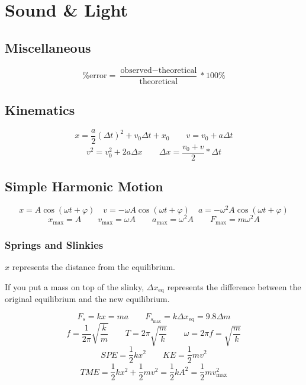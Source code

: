 \chapter{Sound \& Light}

\newcommand\meter[0]{\text{m}}
\newcommand\watt[0]{\text{W}}
\newcommand\Joule[0]{\text{J}}
\newcommand\second[0]{\text{s}}
\newcommand\decibel[0]{\text{dB}}

\section{Miscellaneous}

\[
	\text{\% error} = \frac{\text{observed} - \text{theoretical}}{\text{theoretical}} * 100\%
\]

\section{Kinematics}

\[
	x = \frac{a}{2}(\Delta t)^2 + v_0\Delta t + x_0 \qquad
	v = v_0 + a\Delta t
\]\[
	v^2 = v_0^2 + 2a\Delta x \qquad
	\Delta x = \frac{v_0 + v}{2} * \Delta t
\]

\section{Simple Harmonic Motion}

\[
	x = A \cos(\omega t + \varphi) \quad
	v = -\omega A \cos(\omega t + \varphi) \quad
	a = -\omega^2 A \cos(\omega t + \varphi)
\]
\[
	x_{\max} = A \qquad
	v_{\max} = \omega A \qquad
	a_{\max} = \omega^2 A \qquad
	F_{\max} = m\omega^2 A
\]

\subsection{Springs and Slinkies}

$x$ represents the distance from the equilibrium.

If you put a mass on top of the slinky, $\Delta x_\text{eq}$ represents the difference between the original equilibrium and the new equilibrium.

\[
	F_s = kx = ma \qquad
	F_{s_{\max}} = k\Delta x_\text{eq} = 9.8 \Delta m
\]
\[
	f = \frac{1}{2\pi}\sqrt{\frac{k}{m}} \qquad 
	T = 2\pi\sqrt{\frac{m}{k}} \qquad 
	\omega = 2\pi f = \sqrt{\frac{m}{k}}
\]
\[
	SPE = \frac{1}{2} kx^2 \qquad
	KE = \frac{1}{2} mv^2
\]
\[
	TME = \frac{1}{2} kx^2 + \frac{1}{2} mv^2 = \frac{1}{2} kA^2 = \frac{1}{2} mv_{\max}^2
\]

